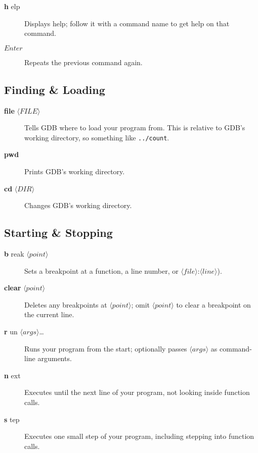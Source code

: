 \documentclass[11pt]{article}
\newcommand\dbc[2]{{%
  \sffamily\upshape\mdseries
  \textbf{\textcolor{Abbreviation} {#1}}%
  #2}}
\newcommand\abw[1]{$\langle\mathit{#1}\rangle$}
\begin{document}
\begin{multicols}{2}
\begin{description}

  \item[\dbc{h}{elp}] Displays help; follow it with a command name to
    get help on that command.

  \item[$\mathit{Enter}$] Repeats the previous command
    again.

\end{description}

\subsection*{Finding \& Loading}

\begin{description}
  \item[\dbc{file}{} \abw{FILE}] Tells GDB where to load your program
    from. This is relative to GDB’s working directory, so
    something like \verb!../count!.

  \item[\dbc{pwd}{}] Prints GDB’s working directory.

  \item[\dbc{cd}{} \abw{DIR}] Changes GDB’s working directory.
\end{description}

\subsection*{Starting \& Stopping}
\begin{description}

  \item[\dbc{b}{reak} \abw{point}] Sets a breakpoint at a function, a
    line number, or \abw{file}:\abw{line}).

  \item[\dbc{clear}{} \abw{point}] Deletes any breakpoints at
    \abw{point}; omit \abw{point} to clear a breakpoint on the current
    line.

  \item[\dbc{r}{un} \abw{args}\ldots] Runs your program from the start;
    optionally passes \abw{args} as command-line arguments.

  \item[\dbc{n}{ext}] Executes until the next line of your program, not
    looking inside function calls.

  \item[\dbc{s}{tep}] Executes one small step of your program, including
    stepping into function calls.


\end{description}
\end{multicols}
\end{document}
